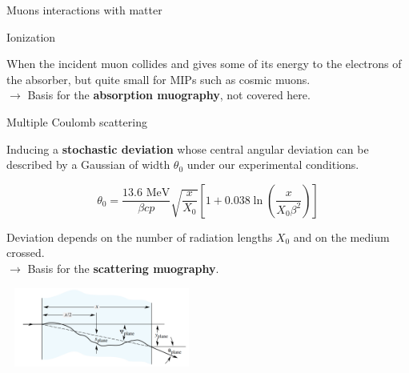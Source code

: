 \documentclass[8 pt]{beamer}
\begin{document}
\begin{frame}{Muons interactions with matter}
\justifying
\begin{exampleblock}{} Ionization \end{exampleblock}
When  the  incident  muon collides and gives some of its energy to the electrons of the absorber, but quite small for MIPs such as cosmic muons. \\
\hspace{10pt} $\rightarrow$ Basis for the \textbf{\alert{absorption muography}}, not covered here. \vfill

\begin{exampleblock}{} Multiple Coulomb scattering \end{exampleblock}
Inducing a \alert{\textbf{stochastic deviation}} whose central angular deviation can be described by a Gaussian of width $\theta_0$ under our experimental conditions.

\begin{minipage}[c]{.48\textwidth}
\begin{equation*}
\label{eq:Moliere}
\theta_0 = \frac{13.6 \text{ MeV}}{\beta c p} \sqrt{\frac{x}{X_0}} \left [1 + 0.038 \ln \left (\frac{x}{X_0 \beta^2} \right ) \right ]
\end{equation*}

\justifying
Deviation depends on the number of radiation lengths $X_0$ and on the medium crossed. \\
\hspace{10pt} $\rightarrow$ Basis for the \textbf{\alert{scattering muography}}.
\end{minipage} \hfill
\begin{minipage}[c]{.51\textwidth}
	\includegraphics[width=6.3cm, height=2.6cm]{figs/moliere.png}
\end{minipage} \hfill \vfill
\end{frame}
\end{document}
